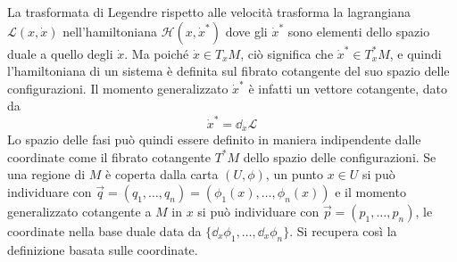 La trasformata di Legendre rispetto alle velocità trasforma la lagrangiana $\mathcal{L}(x,\dot{x})$ nell'hamiltoniana $\mathcal{H}(x,\dot{x}^*)$ dove gli $\dot{x}^*$ sono elementi dello spazio duale a quello degli $\dot{x}$. Ma poiché $\dot{x} \in T_x M$, ciò significa che $\dot{x}^* \in T_x^* M$, e quindi l'hamiltoniana di un sistema è definita sul fibrato cotangente del suo spazio delle configurazioni. Il momento generalizzato $\dot{x}^*$ è infatti un vettore cotangente, dato da \begin{equation*}
  \dot{x}^* = \dd_{\dot{x}} \mathcal{L}
\end{equation*}
Lo spazio delle fasi può quindi essere definito in maniera indipendente dalle coordinate come il fibrato cotangente $T^* M$ dello spazio delle configurazioni. Se una regione di $M$ è coperta dalla carta $(U,\phi)$, un punto $x \in U$ si può individuare con $\vec{q} = (q_1, \ldots, q_n) = (\phi_1(x), \ldots, \phi_n(x))$ e il momento generalizzato cotangente a $M$ in $x$ si può individuare con $\vec{p}=(p_1, \ldots, p_n)$, le coordinate nella base duale data da $\{\dd_x \phi_1, \ldots, \dd_x \phi_n\} $. Si recupera così la definizione basata sulle coordinate.

